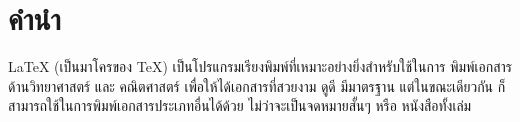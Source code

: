 
%

\chapter{คำนำ}

\LaTeX{} (เป็นมาโครของ \TeX) เป็นโปรแกรมเรียงพิมพ์ที่เหมาะอย่างยิ่งสำหรับใช้ในการ%
พิมพ์เอกสารด้านวิทยาศาสตร์ และ คณิตศาสตร์ เพื่อให้ได้เอกสารที่สวยงาม ดูดี มีมาตรฐาน
แต่ในขณะเดียวกัน ก็สามารถใช้ในการพิมพ์เอกสารประเภทอื่นได้ด้วย ไม่ว่าจะเป็นจดหมายสั้นๆ
หรือ หนังสือทั้งเล่ม 

\shbtoaddmoretranslation
